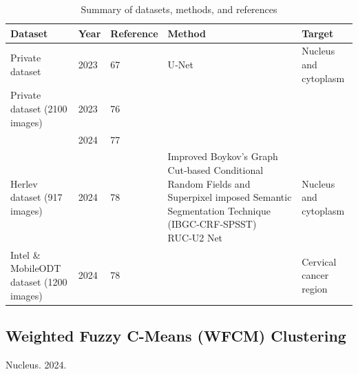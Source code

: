 \documentclass{svjour3}
\begin{document}
\begin{table}[htbp]
\centering
\caption{Summary of datasets, methods, and references}
\label{tab:summary}
\begin{tabular}{lllll}
\hline
Dataset & Year & Reference & Method & Target \\
\hline
Private dataset & 2023 & 67 & U‑Net & Nucleus and cytoplasm \\
Private dataset (2100 images) & 2023 & 76 & & \\
 & 2024 & 77 & & \\
Herlev dataset (917 images) & 2024 & 78 & Improved Boykov’s Graph Cut‑based Conditional Random Fields and Superpixel imposed Semantic Segmentation Technique (IBGC‑CRF‑SPSST) RUC‑U2 Net & Nucleus and cytoplasm \\
Intel \& MobileODT dataset (1200 images) & 2024 & 78 & & Cervical cancer region \\
\hline
\end{tabular}
\end{table}

\cite{ref78}
\subsection{Weighted Fuzzy C-Means (WFCM) Clustering}
Nucleus. 2024.
\cite{ref79}
\end{document}
